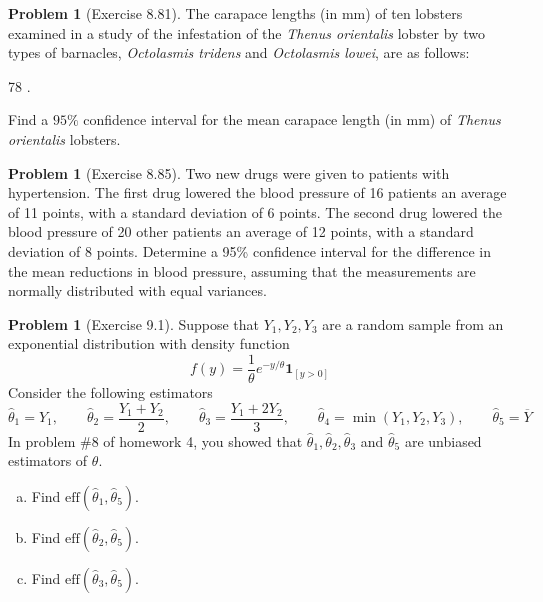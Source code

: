 \documentclass[10pt]{article}
\theoremstyle{definition}
\newtheorem{problem}[theorem]{Problem}
\newcommand{\1}[1]{\textbf{1}_{\left[#1\right]}} %
\begin{document}
\begin{problem}[Exercise 8.81]
  The carapace lengths (in mm) of ten lobsters examined in a study of the
  infestation of the \textit{Thenus orientalis} lobster by two types of
  barnacles, \textit{Octolasmis tridens} and \textit{Octolasmis lowei}, are as
  follows:
  \begin{center}
    78        
    .
  \end{center}
  Find a $95\%$ confidence interval for the mean carapace length (in mm) of
  \textit{Thenus orientalis} lobsters.
\end{problem}

\begin{problem}[Exercise 8.85]
  Two new drugs were given to patients with hypertension. The ﬁrst drug
  lowered the blood pressure of 16 patients an average of 11 points, with a
  standard deviation of 6 points. The second drug lowered the blood pressure
  of 20 other patients an average of 12 points, with a standard deviation of 8
  points. Determine a 95\% conﬁdence interval for the difference in the
  mean reductions in blood pressure, assuming that the measurements are
  normally distributed with equal variances.
\end{problem}

\begin{problem}[Exercise 9.1]
  Suppose that $Y_{1},Y_{2},Y_{3}$ are a random sample from an exponential
  distribution with density function
  \begin{equation*}
    f(y) = \frac{1}{\theta}e^{-y/\theta}\mathbf{1}_{\left[ y>0 \right] }
  \end{equation*}
  Consider the following estimators
  \begin{equation*}
    \hat{\theta}_{1} =Y_{1}, \quad\quad \widehat{\theta}_{2}= \frac{Y_{1}+Y_{2}}{2}, \quad\quad \widehat{\theta}_{3} = \frac{Y_{1}+2Y_{2}}{3}, \quad\quad \widehat{\theta}_{4} = \min(Y_{1},Y_{2},Y_{3}), \quad\quad \widehat{\theta}_{5}= \overline{Y}
  \end{equation*}
  In problem \#8 of homework 4, you showed that
  $\widehat{\theta}_{1},\widehat{\theta}_{2},\widehat{\theta}_{3}$ and $\widehat{\theta}_{5}$ are
  unbiased estimators of $\theta$. 
  \begin{enumerate}[(a)]
    \item Find $\text{eff}(\widehat{\theta}_{1},\widehat{\theta}_{5})$.
    \item Find $\text{eff}(\widehat{\theta}_{2},\widehat{\theta}_{5})$.
    \item Find $\text{eff}(\widehat{\theta}_{3},\widehat{\theta}_{5})$.
  \end{enumerate}
\end{problem}
\end{document}
